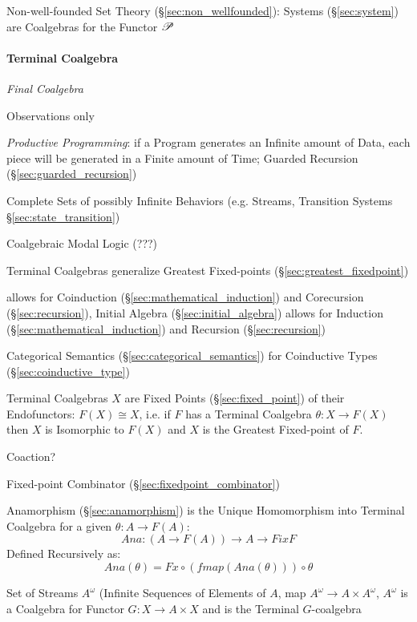 Non-well-founded Set Theory (\S\ref{sec:non_wellfounded}): Systems
(\S\ref{sec:system}) are Coalgebras for the Functor $\mathscr{P}$



\paragraph{Terminal Coalgebra}\label{sec:terminal_coalgebra}\hfill

\emph{Final Coalgebra}

Observations only

\emph{Productive Programming}: if a Program generates an Infinite
amount of Data, each piece will be generated in a Finite amount of
Time; Guarded Recursion (\S\ref{sec:guarded_recursion})
\cite{atkey-mcbride13}

Complete Sets of possibly Infinite Behaviors (e.g. Streams, Transition
Systems \S\ref{sec:state_transition})

Coalgebraic Modal Logic (???)

Terminal Coalgebras generalize Greatest Fixed-points
(\S\ref{sec:greatest_fixedpoint}) \cite{rutten00}

allows for Coinduction (\S\ref{sec:mathematical_induction}) and
Corecursion (\S\ref{sec:recursion}), Initial Algebra
(\S\ref{sec:initial_algebra}) allows for Induction
(\S\ref{sec:mathematical_induction}) and Recursion
(\S\ref{sec:recursion})

Categorical Semantics (\S\ref{sec:categorical_semantics}) for
Coinductive Types (\S\ref{sec:coinductive_type})

Terminal Coalgebras $X$ are Fixed Points (\S\ref{sec:fixed_point}) of
their Endofunctors: $F(X) \cong X$, i.e. if $F$ has a Terminal
Coalgebra $\theta : X \rightarrow F(X)$ then $X$ is Isomorphic to
$F(X)$ and $X$ is the Greatest Fixed-point of $F$.

Coaction?

Fixed-point Combinator (\S\ref{sec:fixedpoint_combinator})

Anamorphism (\S\ref{sec:anamorphism}) is the Unique Homomorphism into
Terminal Coalgebra for a given $\theta : A \rightarrow F(A)$:
\[
  Ana : (A \rightarrow F (A)) \rightarrow A \rightarrow Fix F
\]
Defined Recursively as:
\[
  Ana (\theta) = Fx \circ (fmap (Ana (\theta))) \circ \theta
\]

Set of Streams $A^\omega$ (Infinite Sequences of Elements of $A$, map
$A^\omega \rightarrow A \times A^\omega$, $A^\omega$ is a Coalgebra
for Functor $G : X \rightarrow A \times X$ and is the Terminal
$G$-coalgebra

